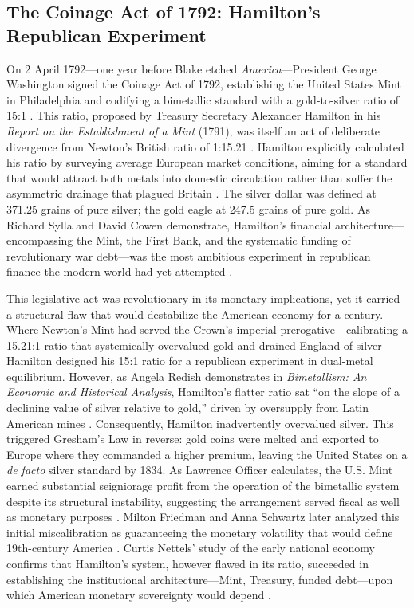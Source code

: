 \documentclass[
]{article}
\begin{document}
\subsection{The Coinage Act of 1792: Hamilton's Republican
Experiment}\label{the-coinage-act-of-1792-hamiltons-republican-experiment}

On 2 April 1792---one year before Blake etched
\emph{America}---President George Washington signed the Coinage Act of
1792, establishing the United States Mint in Philadelphia and codifying
a bimetallic standard with a gold-to-silver ratio of 15:1
\citep{laughlin1898bimetallism}. This ratio, proposed by Treasury
Secretary Alexander Hamilton in his \emph{Report on the Establishment of
a Mint} (1791), was itself an act of deliberate divergence from Newton's
British ratio of 1:15.21 \citep{hamilton1791report}. Hamilton explicitly
calculated his ratio by surveying average European market conditions,
aiming for a standard that would attract both metals into domestic
circulation rather than suffer the asymmetric drainage that plagued
Britain \citep{sylla2018hamiltons}. The silver dollar was defined at
371.25 grains of pure silver; the gold eagle at 247.5 grains of pure
gold. As Richard Sylla and David Cowen demonstrate, Hamilton's financial
architecture---encompassing the Mint, the First Bank, and the systematic
funding of revolutionary war debt---was the most ambitious experiment in
republican finance the modern world had yet attempted
\citep{sylla2018hamiltons}.

This legislative act was revolutionary in its monetary implications, yet
it carried a structural flaw that would destabilize the American economy
for a century. Where Newton's Mint had served the Crown's imperial
prerogative---calibrating a 15.21:1 ratio that systemically overvalued
gold and drained England of silver---Hamilton designed his 15:1 ratio
for a republican experiment in dual-metal equilibrium. However, as
Angela Redish demonstrates in \emph{Bimetallism: An Economic and
Historical Analysis}, Hamilton's flatter ratio sat ``on the slope of a
declining value of silver relative to gold,'' driven by oversupply from
Latin American mines \citep{redish2000bimetallism}. Consequently,
Hamilton inadvertently overvalued silver. This triggered Gresham's Law
in reverse: gold coins were melted and exported to Europe where they
commanded a higher premium, leaving the United States on a \emph{de
facto} silver standard by 1834. As Lawrence Officer calculates, the U.S.
Mint earned substantial seigniorage profit from the operation of the
bimetallic system despite its structural instability, suggesting the
arrangement served fiscal as well as monetary purposes
\citep{officer2001bimetallism}. Milton Friedman and Anna Schwartz later
analyzed this initial miscalibration as guaranteeing the monetary
volatility that would define 19th-century America
\citep{friedman1963monetary}. Curtis Nettels' study of the early
national economy confirms that Hamilton's system, however flawed in its
ratio, succeeded in establishing the institutional architecture---Mint,
Treasury, funded debt---upon which American monetary sovereignty would
depend \citep{nettels1962emergence}.
\end{document}
